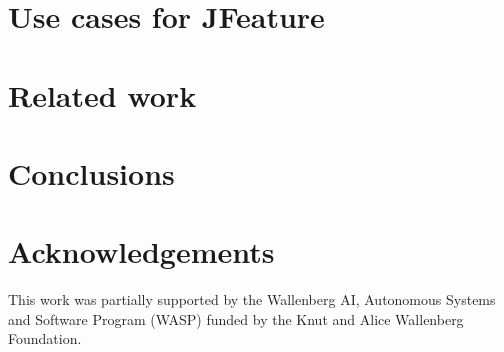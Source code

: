 \section{Use cases for JFeature}%
\label{JF:sec:discussion}


\section{Related work}%
\label{JF:sec:related-works}


\section{Conclusions}%
\label{JF:sec:conclusions}



\section*{Acknowledgements}

This work was partially supported by the Wallenberg AI, Autonomous Systems and Software Program (WASP) funded by the Knut and Alice Wallenberg Foundation.

{\raggedright%
\printbibliography[segment=\therefsegment,heading=subbibliography]
}